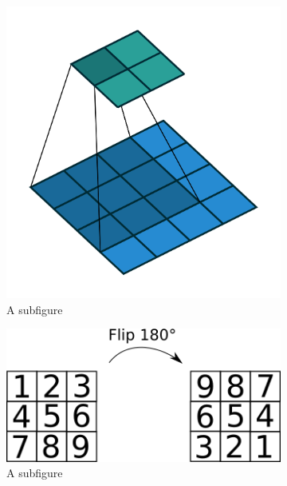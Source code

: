 \begin{figure}
	\centering
	\begin{subfigure}[t]{.30\textwidth}
  		\centering
  		\includegraphics[width=.8\linewidth]{imgs/crbm_padding1.png}
  		\caption{A subfigure}
  		\label{fig:sub1}
	\end{subfigure}%
	\begin{subfigure}[t]{.30\textwidth}
  		\centering
  		\includegraphics[width=.8\linewidth]{imgs/kernel_flip.png}
  		\caption{A subfigure}
  		\label{fig:sub2}
	\end{subfigure}
	\begin{subfigure}[t]{.30\textwidth}
  		\centering

\end{subfigure}
\end{figure}

